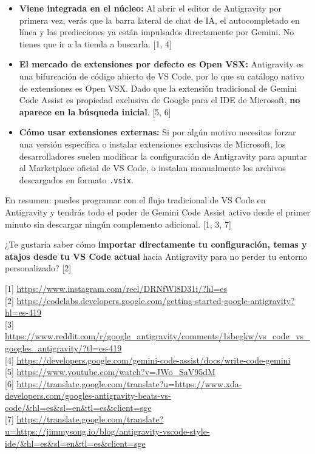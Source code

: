 \documentclass[12pt, a4paper]{article}
\begin{document}
\begin{itemize}
    \item \textbf{Viene integrada en el núcleo:} Al abrir el editor de Antigravity por primera vez, verás que la barra lateral de chat de IA, el autocompletado en línea y las predicciones ya están impulsados directamente por Gemini. No tienes que ir a la tienda a buscarla. [1, 4]
    \item \textbf{El mercado de extensiones por defecto es Open VSX:} Antigravity es una bifurcación de código abierto de VS Code, por lo que su catálogo nativo de extensiones es Open VSX. Dado que la extensión tradicional de Gemini Code Assist es propiedad exclusiva de Google para el IDE de Microsoft, \textbf{no aparece en la búsqueda inicial}. [5, 6]
    \item \textbf{Cómo usar extensiones externas:} Si por algún motivo necesitas forzar una versión específica o instalar extensiones exclusivas de Microsoft, los desarrolladores suelen modificar la configuración de Antigravity para apuntar al Marketplace oficial de VS Code, o instalan manualmente los archivos descargados en formato \texttt{.vsix}.
\end{itemize}

En resumen: puedes programar con el flujo tradicional de VS Code en Antigravity y tendrás todo el poder de Gemini Code Assist activo desde el primer minuto sin descargar ningún complemento adicional. [1, 3, 7]

¿Te gustaría saber cómo \textbf{importar directamente tu configuración, temas y atajos desde tu VS Code actual} hacia Antigravity para no perder tu entorno personalizado? [2]

[1] \url{https://www.instagram.com/reel/DRNfWl8D31i/?hl=es} \\{}
[2] \url{https://codelabs.developers.google.com/getting-started-google-antigravity?hl=es-419} \\{}
[3] \url{https://www.reddit.com/r/google_antigravity/comments/1sbegkw/vs_code_vs_googles_antigravity/?tl=es-419} \\{}
[4] \url{https://developers.google.com/gemini-code-assist/docs/write-code-gemini} \\{}
[5] \url{https://www.youtube.com/watch?v=JWo_SaV95dM} \\{}
[6] \url{https://translate.google.com/translate?u=https://www.xda-developers.com/googles-antigravity-beats-vs-code/&hl=es&sl=en&tl=es&client=sge} \\{}
[7] \url{https://translate.google.com/translate?u=https://jimmysong.io/blog/antigravity-vscode-style-ide/&hl=es&sl=en&tl=es&client=sge}
\end{document}
